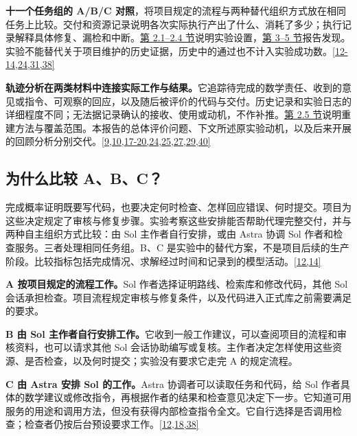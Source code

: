\textbf{十一个任务组的 A/B/C 对照}，将项目规定的流程与两种替代组织方式放在相同任务上比较。交付和资源记录说明各次实际执行产出了什么、消耗了多少；执行记录解释具体修复、漏检和中断。\hyperlink{section-2-1}{第 2.1–2.4 节}说明实验设置，\hyperlink{section-3}{第 3–5 节}报告发现。实验不能替代关于项目维护的历史证据，历史中的通过也不计入实验成功数。\hyperlink{ref-12}{\mbox{[12-14,24,31,38]}}

\textbf{轨迹分析在两类材料中连接实际工作与结果。}它追踪待完成的数学责任、收到的意见或指令、可观察的回应，以及随后被评价的代码与交付。历史记录和实验日志的详细程度不同；无法据记录确认的接收、使用或动机，不作补推。\hyperlink{section-2-5}{第 2.5 节}说明重建方法与覆盖范围。本报告的总体评价问题、下文所述原实验动机，以及后来开展的回顾分析分别交代。\hyperlink{ref-9}{\mbox{[9,10,17-20,24,25,27,29,40]}}

\subsection[为什么比较 A、B、C？]{\texorpdfstring{\protect\hypertarget{section-2-1}{}为什么比较 A、B、C？}{为什么比较 A、B、C？}}
完成概率证明既要写代码，也要决定何时检查、怎样回应错误、何时提交。项目为这些决定规定了审核与修复步骤。实验考察这些安排能否帮助代理完整交付，并与两种自主组织方式比较：由 Sol 主作者自行安排，或由 Astra 协调 Sol 作者和检查服务。三者处理相同任务组。B、C 是实验中的替代方案，不是项目后续的生产阶段。比较指标包括完成情况、求解经过时间和记录到的模型活动。\hyperlink{ref-12}{\mbox{[12,14]}}

\textbf{A 按项目规定的流程工作。}Sol 作者选择证明路线、检索库和修改代码，其他 Sol 会话承担检查。项目流程规定审核与修复条件，以及代码进入正式库之前需要满足的要求。

\textbf{B 由 Sol 主作者自行安排工作。}它收到一般工作建议，可以查阅项目的流程和审核资料，也可以请求其他 Sol 会话协助编写或复核。主作者决定怎样使用这些资源、是否检查，以及何时提交；实验没有要求它走完 A 的规定流程。

\textbf{C 由 Astra 安排 Sol 的工作。}Astra 协调者可以读取任务和代码，给 Sol 作者具体的数学建议或修改指令，再根据作者的结果和检查意见决定下一步。它知道可用服务的用途和调用方法，但没有获得内部检查指令全文。它自行选择是否调用检查；检查者仍按后台预设要求工作。\hyperlink{ref-12}{\mbox{[12,18,38]}}


